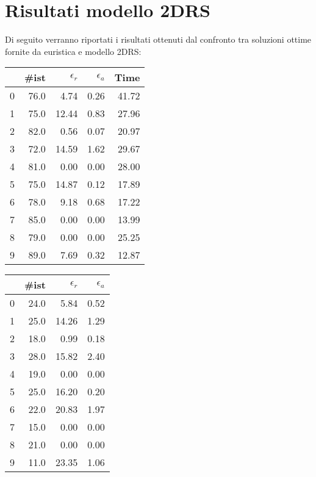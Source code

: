 \section{Risultati modello 2DRS}
Di seguito verranno riportati i risultati ottenuti dal confronto tra soluzioni ottime fornite da euristica e modello 2DRS:
\begin{center}
	\begin{table}[H]
		\begin{minipage}{0.45\textwidth}
			\centering
			\begin{tabular}{lrrrr}
				\toprule
				{} & \#ist & $\epsilon_r$ & $\epsilon_a$ & Time  \\
				\midrule
				0  & 76.0  & 4.74         & 0.26         & 41.72 \\
				1  & 75.0  & 12.44        & 0.83         & 27.96 \\
				2  & 82.0  & 0.56         & 0.07         & 20.97 \\
				3  & 72.0  & 14.59        & 1.62         & 29.67 \\
				4  & 81.0  & 0.00         & 0.00         & 28.00 \\
				5  & 75.0  & 14.87        & 0.12         & 17.89 \\
				6  & 78.0  & 9.18         & 0.68         & 17.22 \\
				7  & 85.0  & 0.00         & 0.00         & 13.99 \\
				8  & 79.0  & 0.00         & 0.00         & 25.25 \\
				9  & 89.0  & 7.69         & 0.32         & 12.87 \\
				\bottomrule
			\end{tabular}
		\end{minipage}
		\begin{minipage}{0.5\textwidth}
			\centering
			\begin{tabular}{lrrr}
				\toprule
				{} & \#ist & $\epsilon_r$ & $\epsilon_a$ \\
				\midrule
				0  & 24.0  & 5.84         & 0.52         \\
				1  & 25.0  & 14.26        & 1.29         \\
				2  & 18.0  & 0.99         & 0.18         \\
				3  & 28.0  & 15.82        & 2.40         \\
				4  & 19.0  & 0.00         & 0.00         \\
				5  & 25.0  & 16.20        & 0.20         \\
				6  & 22.0  & 20.83        & 1.97         \\
				7  & 15.0  & 0.00         & 0.00         \\
				8  & 21.0  & 0.00         & 0.00         \\
				9  & 11.0  & 23.35        & 1.06         \\
				\bottomrule
			\end{tabular}
		\end{minipage}
	\end{table}
\end{center}

